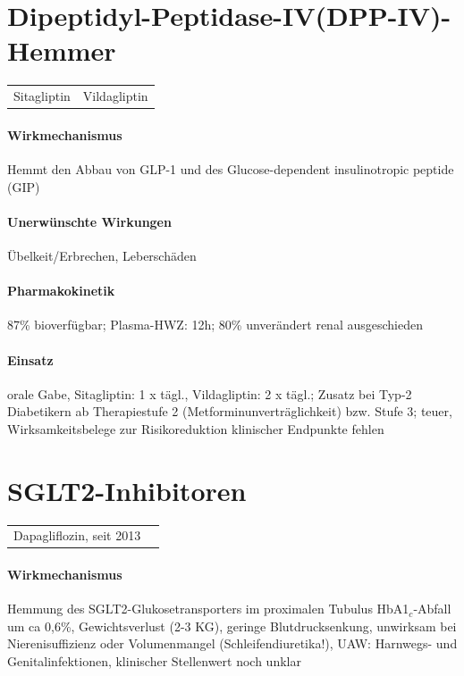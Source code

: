 \documentclass[10pt,a4paper]{report}
\begin{document}
\section{Dipeptidyl-Peptidase-IV(DPP-IV)-Hemmer} %
\label{sec:dipeptidyl_peptidase_iv_dpp_iv_hemmer}
\begin{tabularx}{\textwidth}{XX}
Sitagliptin&Vildagliptin\\
\end{tabularx}
\paragraph{Wirkmechanismus} %
\label{par:wirkmechanismus}
Hemmt den Abbau von GLP-1 und des
Glucose-dependent insulinotropic peptide (GIP)
\paragraph{Unerwünschte Wirkungen} %
\label{par:unerw_nschte_wirkungen}
Übelkeit/Erbrechen, Leberschäden 
\paragraph{Pharmakokinetik} %
\label{par:pharmakokinetik}
87\% bioverfügbar; Plasma-HWZ: 12h; 80\% unverändert renal ausgeschieden 
\paragraph{Einsatz} %
\label{par:einsatz}
orale Gabe, Sitagliptin: 1 x tägl., Vildagliptin: 2 x tägl.; Zusatz bei Typ-2 Diabetikern ab Therapiestufe 2 (Metforminunverträglichkeit) bzw. Stufe 3; teuer, Wirksamkeitsbelege zur Risikoreduktion klinischer Endpunkte fehlen
\section{SGLT2-Inhibitoren} %
\label{sec:sglt2_inhibitoren}
\begin{tabularx}{\textwidth}{XX}
Dapagliflozin, seit 2013\\
\end{tabularx}
\paragraph{Wirkmechanismus} %
\label{par:wirkmechanismus}
Hemmung des SGLT2-Glukosetransporters im proximalen Tubulus 
HbA1$_c$-Abfall um ca 0,6\%, Gewichtsverlust (2-3 KG), geringe Blutdrucksenkung, unwirksam bei Nierenisuffizienz oder Volumenmangel (Schleifendiuretika!), UAW: Harnwegs- und Genitalinfektionen, klinischer Stellenwert noch unklar
\end{document}
